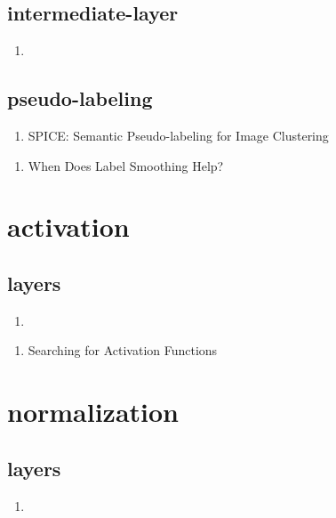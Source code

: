 \documentclass[acmlarge]{acmart}
\begin{document}
	\subsection{intermediate-layer}
	\begin{enumerate}
		\item
	\end{enumerate}
	\subsection{pseudo-labeling}
	\begin{enumerate}
		\item SPICE: Semantic Pseudo-labeling for Image Clustering \cite{Niu2021SPICESP} 

	\end{enumerate}
\begin{enumerate}
	\item When Does Label Smoothing Help? \cite{Mller2019WhenDL} 

\end{enumerate}
\section{activation}
	\subsection{layers}
	\begin{enumerate}
		\item
	\end{enumerate}
\begin{enumerate}
	\item Searching for Activation Functions \cite{Ramachandran2018SearchingFA} 

\end{enumerate}
\section{normalization}
	\subsection{layers}
	\begin{enumerate}
		\item
	\end{enumerate}
\end{document}
